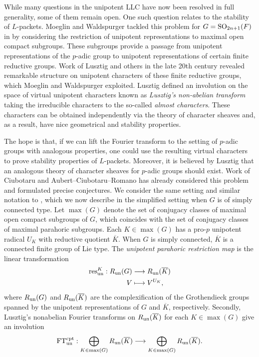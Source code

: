 While many questions in the unipotent LLC have now been resolved in full generality, some of them remain open. One such question relates to the stability of $L$-packets. Moeglin and Waldspurger tackled this problem for $G=\mathrm{SO}_{2n+1}(F)$ in \cite{MoglinWaldspurger2003} by considering the restriction of unipotent representations to maximal open compact subgroups. These subgroups provide a passage from unipotent representations of the $p$-adic group to unipotent representations of certain finite reductive groups. Work of Lusztig and others in the late 20th century revealed remarkable structure on unipotent characters of these finite reductive groups, which Moeglin and Waldspurger exploited. Lusztig defined an involution on the space of virtual unipotent characters known as \textit{Lusztig's non-abelian transform} taking the irreducible characters to the so-called \textit{almost characters}. These characters can be obtained independently via the theory of character sheaves and, as a result, have nice geometrical and stability properties. 

The hope is that, if we can lift the Fourier transform to the setting of $p$-adic groups with analogous properties, one could use the resulting virtual characters to prove stability properties of $L$-packets. Moreover, it is believed by Lusztig that an analogous theory of character sheaves for $p$-adic groups should exist. Work of Ciubotaru \cite{Ciubotaru2020} and Aubert--Ciubotaru--Romano \cite{AubertCiubotaruRomano2024} has already considered this problem and formulated precise conjectures. We consider the same setting and similar notation to \cite{AubertCiubotaruRomano2024}, which we now describe in the simplified setting when $G$ is of simply connected type. Let $\max(G)$ denote the set of conjugacy classes of maximal open compact subgroups of $G$, which coincides with the set of conjugacy classes of maximal parahoric subgroups. Each $K\in\max(G)$ has a pro-$p$ unipotent radical $U_K$ with reductive quotient $\overline{K}$. When $G$ is simply connected, $\overline{K}$ is a connected finite group of Lie type. The \textit{unipotent parahoric restriction map} is the linear transformation
\begin{align*}
    \mathrm{res}_{\mathrm{un}}^{K}:R_{\mathrm{un}}(G)&\longrightarrow R_{\mathrm{un}}(\overline{K})\\
    V&\longmapsto V^{U_K},
\end{align*}
where $R_{\mathrm{un}}(G)$ and $R_{\mathrm{un}}(\overline{K})$ are the complexification of the Grothendieck groups spanned by the unipotent representations of $G$ and $\overline{K}$, respectively. Secondly, Lusztig's nonabelian Fourier transforms on $R_{\mathrm{un}}(\overline{K})$ for each $K\in\max(G)$ give an involution 
\begin{equation*}
    \mathrm{FT}^{\mathrm{cpt}}_{\mathrm{un}}:\bigoplus_{K\in\max(G)}R_{\mathrm{un}}(\overline{K})\longrightarrow\bigoplus_{K\in\max(G)}R_{\mathrm{un}}(\overline{K}).
\end{equation*}

